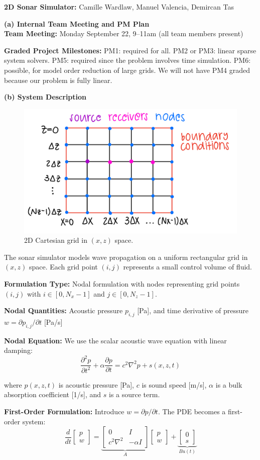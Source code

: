 \documentclass[11pt]{article}
\begin{document}
\textbf{2D Sonar Simulator: } Camille Wardlaw, Manuel Valencia, Demircan Tas 


\textbf{(a) Internal Team Meeting and PM Plan}\\
\textbf{Team Meeting:} Monday September 22, 9--11am (all team members present)

\textbf{Graded Project Milestones:}
PM1: required for all. PM2 or PM3: linear sparse system solvers. PM5: required since the problem involves time simulation. PM6: possible, for model order reduction of large grids. We will not have PM4 graded because our problem is fully linear.

\textbf{(b) System Description}

\begin{figure}[h]
    \centering
    \includegraphics[width=0.5\linewidth]{system.jpeg}
    \caption{2D Cartesian grid in $(x,z)$ space.}
\end{figure}

The sonar simulator models wave propagation on a uniform rectangular grid in $(x,z)$ space. Each grid point $(i,j)$ represents a small control volume of fluid.

\textbf{Formulation Type:} Nodal formulation with nodes representing grid points $(i,j)$ with $i \in [0,N_x-1]$ and $j \in [0,N_z-1]$.

\textbf{Nodal Quantities:} Acoustic pressure $p_{i,j}$ [Pa], and time derivative of pressure $w=\partial p_{i,j}/\partial t$ [Pa/s]


\textbf{Nodal Equation:} We use the scalar acoustic wave equation with linear damping:
\[
\frac{\partial^2 p}{\partial t^2} + \alpha \frac{\partial p}{\partial t} = c^2 \nabla^2 p + s(x,z,t)
\]

where $p(x,z,t)$ is acoustic pressure [Pa], $c$ is sound speed [m/s], $\alpha$ is a bulk absorption coefficient [1/s], and $s$ is a source term.

\textbf{First-Order Formulation:} Introduce $w=\partial p/\partial t$. The PDE becomes a first-order system:
\[
\frac{d}{dt}
\begin{bmatrix}p \\ w\end{bmatrix}
=
\underbrace{\begin{bmatrix}
0 & I \\ c^2 \nabla^2 & -\alpha I
\end{bmatrix}}_{A}
\begin{bmatrix}p \\ w\end{bmatrix}
+
\underbrace{\begin{bmatrix} 0 \\ s \end{bmatrix}}_{B u(t)}
\]
\end{document}
